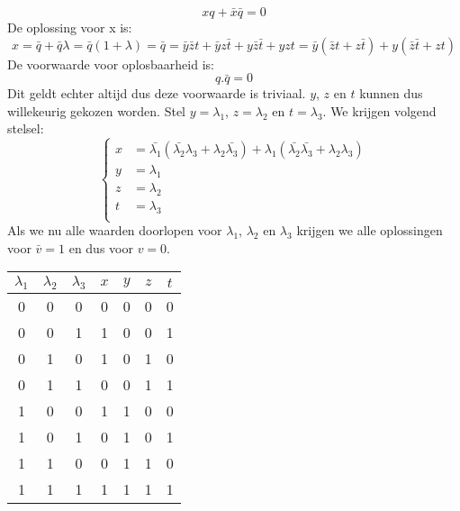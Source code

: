 \documentclass[12pt]{article}
\newcommand{\ov}[1]{\bar{#1}}
\begin{document}
\newline
$$xq + \ov{x}\ov{q} = 0$$
\vspace{2mm}
\newline
De oplossing voor x is:
\vspace{2mm}
\newline
$$x = \ov{q} + \ov{q}\lambda = \ov{q}(1+\lambda) = \ov{q} = \ov{y}\ov{z}t + \ov{y}z\ov{t} + y\ov{z}\ov{t} + yzt = \ov{y}(\ov{z}t + z\ov{t}) + y(\ov{z}\ov{t} + zt)$$
\vspace{2mm}
\newline
De voorwaarde voor oplosbaarheid is:
\vspace{2mm}
\newline
$$q.\ov{q} = 0$$
\vspace{2mm}
\newline
Dit geldt echter altijd dus deze voorwaarde is triviaal. $y$, $z$ en $t$ kunnen dus willekeurig gekozen worden. Stel $y = \lambda_{1}$, $z = \lambda_{2}$ en $t = \lambda_{3}$.
\vspace{2mm}
\newline
We krijgen volgend stelsel:
\vspace{2mm}
\newline
\[ 
	\begin{cases}
	    x &= \ov{\lambda_{1}}(\ov{\lambda_{2}}\lambda_{3} + \lambda_{2}\ov{\lambda_{3}})+\lambda_{1}(\ov{\lambda_{2}}\ov{\lambda_{3}}+\lambda_{2}\lambda_{3})\\
	    y &= \lambda_{1}\\
	    z &= \lambda_{2}\\
	    t &= \lambda_{3}\\
  	\end{cases}
\]
\vspace{2mm}
\newline
Als we nu alle waarden doorlopen voor  $\lambda_{1}$, $\lambda_{2}$ en $\lambda_{3}$ krijgen we alle oplossingen voor $\ov{v} = 1$ en dus voor $v = 0$.

\begin{table}[H]
\centering
\begin{tabular}{|c|c|c||c|c|c|c|}
	\hline
	\bf{$\lambda_{1}$} & \bf{$\lambda_{2}$} & \bf{$\lambda_{3}$} & \bf{$x$} & \bf{$y$} & \bf{$z$} & \bf{$t$} \\
	\hline
	0 & 0 & 0   &   0 & 0 & 0 & 0 \\
	0 & 0 & 1   &   1 & 0 & 0 & 1 \\
	0 & 1 & 0   &   1 & 0 & 1 & 0 \\
	0 & 1 & 1   &   0 & 0 & 1 & 1 \\
	1 & 0 & 0   &   1 & 1 & 0 & 0 \\
	1 & 0 & 1   &   0 & 1 & 0 & 1 \\
	1 & 1 & 0   &   0 & 1 & 1 & 0 \\
	1 & 1 & 1   &   1 & 1 & 1 & 1 \\
	\hline
\end{tabular}
\end{table}
\end{document}
